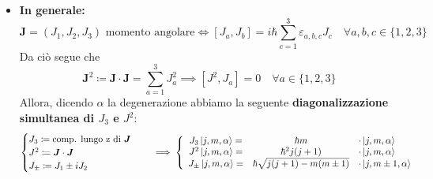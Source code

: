 \documentclass[a4paper,10pt]{article}
\theoremstyle{definition}
\newcommand{\bv}{\boldsymbol} %
\theoremstyle{indentdefinition}
\theoremstyle{indenttheorem}
\theoremstyle{myremark}
\theoremstyle{indentgeneral}
\begin{document}
\begin{itemize}
    \item \textbf{In generale:}
    $$\boxed{\bv{J}=(J_1,J_2,J_3)}\text{ momento angolare}\iff \left[J_a,J_b\right]=i\hbar\sum_{c=1}^3\varepsilon_{a,b,c}J_c\quad \forall a,b,c\in\{1,2,3\}$$
    Da ciò segue che 
    $$\bv{J}^2\coloneqq \bv{J}\cdot\bv{J}=\sum_{a=1}^3J_a^2\implies\left[J^2,J_a\right]=0\quad\forall a\in \{1,2,3\}$$
    Allora, dicendo $\alpha$ la degenerazione abbiamo la seguente \textbf{diagonalizzazione simultanea di $J_3$ e $J^2$}:
    $$\begin{cases}
        J_3 \coloneqq \text{comp. lungo z di }\bv{J}\\
        J^2\coloneqq\bv{J}\cdot\bv{J}\\
        J_\pm\coloneqq J_1\pm i J_2
    \end{cases}\quad \implies \left\{\begin{array}{ccl}
        J_3\ket{j,m,\alpha}=&\hbar m &\cdot \ket{j,m,\alpha} \\
         J^2\ket{j,m,\alpha}=&\hbar^2 j(j+1) &\cdot \ket{j,m,\alpha} \\ 
         J_\pm\ket{j,m,\alpha}=& \hbar\sqrt{j(j+1)-m(m\pm 1)} &\cdot \ket{j,m\pm 1,\alpha} \\ 
    \end{array}\right.$$
    

\end{itemize}
\end{document}
